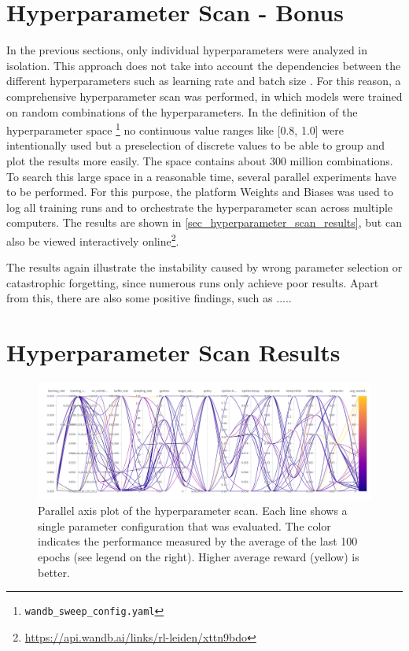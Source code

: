 \documentclass{article}
\begin{document}
\section{Hyperparameter Scan - Bonus}
In the previous sections, only individual hyperparameters were analyzed in isolation. 
This approach does not take into account the dependencies between the different hyperparameters 
such as learning rate and batch size \cite{DBLP:conf/iclr/SmithKYL18}. 
For this reason, a comprehensive hyperparameter scan was performed, in which models were trained on random combinations of the hyperparameters. 
In the definition of the hyperparameter space \footnote{\texttt{wandb\_sweep\_config.yaml}} 
no continuous value ranges like [0.8, 1.0] were intentionally used but a preselection of discrete values to be able to group and plot the results more easily. 
The space contains about 300 million combinations. 
To search this large space in a reasonable time, several parallel experiments have to be performed. 
For this purpose, the platform Weights and Biases \cite{wandb} was used to log all training runs and to orchestrate the hyperparameter scan across multiple computers. 
The results are shown in \autoref{sec_hyperparameter_scan_results}, 
but can also be viewed interactively online\footnote{\url{https://api.wandb.ai/links/rl-leiden/xttn9bdo}}. 

The results again illustrate the instability caused by wrong parameter selection or catastrophic forgetting, 
since numerous runs only achieve poor results.
Apart from this, there are also some positive findings, such as .....

\nocite{DBLP:books/sp/Plaat22}





\appendix
\section{Hyperparameter Scan Results}
\label{sec_hyperparameter_scan_results}

\begin{figure}[h!]
   \centering
   \includegraphics[width=\textwidth]{assets/hyperparamter-scan/W&B Chart 3_30_2023, 2 24 25 PM.png}
   \caption{Parallel axis plot of the hyperparameter scan. 
      Each line shows a single parameter configuration that was evaluated. 
      The color indicates the performance measured by the average of the last 100 epochs (see legend on the right). 
      Higher average reward (yellow) is better.
   }
   \label{fig_hyperparameter_scan_parallel_axis}
\end{figure}
\end{document}
